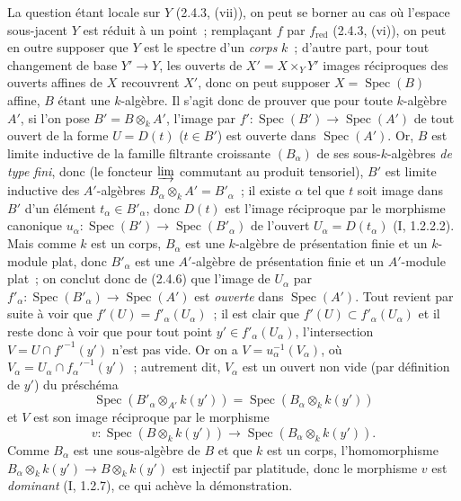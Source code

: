\documentclass[10pt,oneside]{book}
\newcommand{\oldpage}[2][]{%
  \setcounter{footnote}{0}%
  \marginpar{\scriptsize\textbf{#1}~|~#2}\ignorespaces}
\begin{document}
La question étant locale sur $Y$ (2.4.3, (vii)), on peut se borner au cas où
l'espace sous-jacent $Y$ est réduit à un point~; remplaçant $f$ par
$f_{\mathrm{red}}$ (2.4.3, (vi)), on peut en outre supposer que $Y$ est le
spectre d'un \emph{corps} $k$~; d'autre part, pour tout changement de base
$Y'\to Y$, les ouverts de $X'=X\times_Y Y'$ images réciproques des ouverts
affines de $X$ recouvrent $X'$, donc on peut supposer
$X=\operatorname{Spec}(B)$ affine, $B$ étant une $k$-algèbre. Il s'agit donc
de prouver que pour toute $k$-algèbre $A'$, si l'on pose
$B'=B\otimes_k A'$, l'image par
$f':\operatorname{Spec}(B')\to\operatorname{Spec}(A')$ de tout ouvert de la
forme $U=D(t)$ ($t\in B'$) est ouverte dans $\operatorname{Spec}(A')$. Or,
$B$ est limite inductive de la famille filtrante croissante $(B_\alpha)$ de
ses sous-$k$-algèbres \emph{de type fini}, donc (le foncteur
$\varinjlim$ commutant au produit tensoriel), $B'$ est limite inductive des
$A'$-algèbres $B_\alpha\otimes_k A'=B'_\alpha$~; il existe $\alpha$ tel que
$t$ soit image dans $B'$ d'un élément $t_\alpha\in B'_\alpha$, donc $D(t)$
est l'image réciproque par le morphisme canonique
$u_\alpha:\operatorname{Spec}(B')\to\operatorname{Spec}(B'_\alpha)$ de
l'ouvert $U_\alpha=D(t_\alpha)$ (I, 1.2.2.2). Mais comme $k$ est un corps,
$B_\alpha$ est une $k$-algèbre de présentation finie et un $k$-module plat,
donc $B'_\alpha$ est une $A'$-algèbre de présentation finie et un $A'$-module
plat~; on conclut donc de (2.4.6) que l'image de $U_\alpha$ par
$f'_\alpha:\operatorname{Spec}(B'_\alpha)\to\operatorname{Spec}(A')$ est
\emph{ouverte} dans $\operatorname{Spec}(A')$. Tout revient par suite à voir
que $f'(U)=f'_\alpha(U_\alpha)$~; il est clair que
$f'(U)\subset f'_\alpha(U_\alpha)$ et il reste donc à voir que pour tout point
$y'\in f'_\alpha(U_\alpha)$, l'intersection
$V=U\cap f'^{-1}(y')$ n'est pas vide. Or on a
$V=u_\alpha^{-1}(V_\alpha)$, où
$V_\alpha=U_\alpha\cap f_\alpha'^{-1}(y')$~; autrement dit, $V_\alpha$ est
un ouvert non vide (par définition de $y'$) du préschéma
\[
\operatorname{Spec}(B'_\alpha\otimes_{A'}k(y'))
=\operatorname{Spec}(B_\alpha\otimes_k k(y'))
\]
et $V$ est son image réciproque par le morphisme
\[
v:\operatorname{Spec}(B\otimes_k k(y'))
\longrightarrow\operatorname{Spec}(B_\alpha\otimes_k k(y')).
\]
Comme $B_\alpha$ est une sous-algèbre de $B$ et que $k$ est un corps,
l'homomorphisme
$B_\alpha\otimes_k k(y')\to B\otimes_k k(y')$
\oldpage[IV-2]{22}
est injectif par platitude, donc le morphisme $v$ est \emph{dominant}
(I, 1.2.7), ce qui achève la démonstration.
\end{document}
